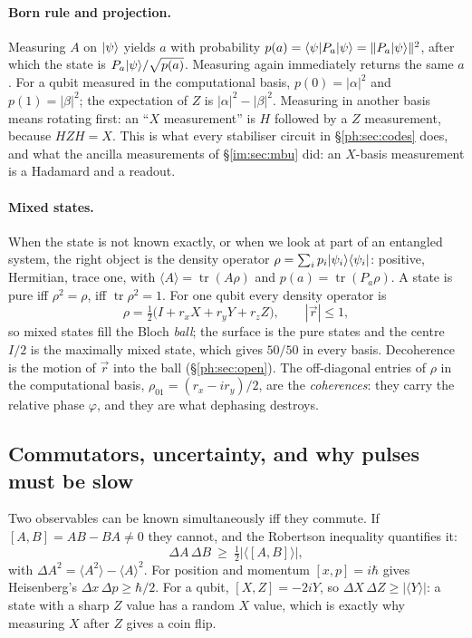 \paragraph{Born rule and projection.} Measuring $A$ on $\lvert \psi \rangle$ yields $a$ with probability
$p(a)=\langle \psi \rvert P_a\lvert \psi \rangle=\|P_a\lvert \psi \rangle\|^2$, after which the state is $P_a\lvert \psi \rangle/\sqrt{p(a)}$.
Measuring again immediately returns the same $a$. For a qubit measured in the computational
basis, $p(0)=|\alpha|^2$ and $p(1)=|\beta|^2$; the expectation of $Z$ is $|\alpha|^2-|\beta|^2$.
Measuring in another basis means rotating first: an ``$X$ measurement'' is $H$ followed by a
$Z$ measurement, because $HZH=X$. This is what every stabiliser circuit in
\S\ref{ph:sec:codes} does, and what the ancilla measurements of \S\ref{im:sec:mbu}
did: an $X$-basis measurement is a Hadamard and a readout.

\paragraph{Mixed states.} When the state is not known exactly, or when we look at part of an
entangled system, the right object is the density operator $\rho=\sum_ip_i\lvert \psi_i \rangle\langle \psi_i \rvert$:
positive, Hermitian, trace one, with $\langle A\rangle=\operatorname{tr}(A\rho)$ and
$p(a)=\operatorname{tr}(P_a\rho)$. A state is pure iff $\rho^2=\rho$, iff
$\operatorname{tr}\rho^2=1$. For one qubit every density operator is
\[ \rho=\tfrac12\big(I+r_xX+r_yY+r_zZ\big),\qquad |\vec r|\le1, \]
so mixed states fill the Bloch \emph{ball}; the surface is the pure states and the centre
$I/2$ is the maximally mixed state, which gives $50/50$ in every basis. Decoherence is the
motion of $\vec r$ into the ball (\S\ref{ph:sec:open}). The off-diagonal entries of $\rho$ in the
computational basis, $\rho_{01}=(r_x-ir_y)/2$, are the \emph{coherences}: they carry the relative
phase $\varphi$, and they are what dephasing destroys.

\subsection{Commutators, uncertainty, and why pulses must be slow}

Two observables can be known simultaneously iff they commute. If $[A,B]=AB-BA\ne0$ they cannot,
and the Robertson inequality quantifies it:
\[ \Delta A\,\Delta B\ \ge\ \tfrac12\big|\langle[A,B]\rangle\big| , \]
with $\Delta A^2=\langle A^2\rangle-\langle A\rangle^2$. For position and momentum $[x,p]=i\hbar$
gives Heisenberg's $\Delta x\,\Delta p\ge\hbar/2$. For a qubit, $[X,Z]=-2iY$, so
$\Delta X\,\Delta Z\ge|\langle Y\rangle|$: a state with a sharp $Z$ value has a random $X$ value,
which is exactly why measuring $X$ after $Z$ gives a coin flip.

